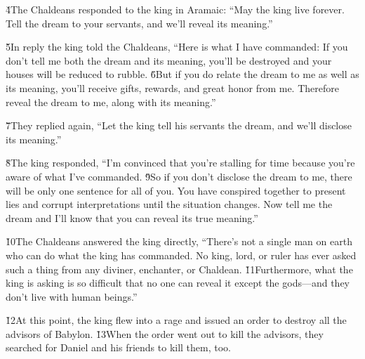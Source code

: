 \v{4}The Chaldeans responded to the king in Aramaic: ``May the king live forever. Tell the dream to your servants, and we'll reveal its meaning.''

\v{5}In reply the king told the Chaldeans, ``Here is what I have commanded: If you don't tell me both the dream and its meaning, you'll be destroyed and your houses will be reduced to rubble. \v{6}But if you do relate the dream to me as well as its meaning, you'll receive gifts, rewards, and great honor from me. Therefore reveal the dream to me, along with its meaning.''

\v{7}They replied again, ``Let the king tell his servants the dream, and we'll disclose its meaning.''

\v{8}The king responded, ``I'm convinced that you're stalling for time because you're aware of what I've commanded. \v{9}So if you don't disclose the dream to me, there will be only one sentence for all of you. You have conspired together to present lies and corrupt interpretations until the situation changes. Now tell me the dream and I'll know that you can reveal its true meaning.''

\v{10}The Chaldeans answered the king directly, ``There's not a single man on earth who can do what the king has commanded. No king, lord, or ruler has ever asked such a thing from any diviner, enchanter, or Chaldean. \v{11}Furthermore, what the king is asking is so difficult that no one can reveal it except the gods---and they don't live with human beings.''

\v{12}At this point, the king flew into a rage and issued an order to destroy all the advisors of Babylon. \v{13}When the order went out to kill the advisors, they searched for Daniel and his friends to kill them, too.

